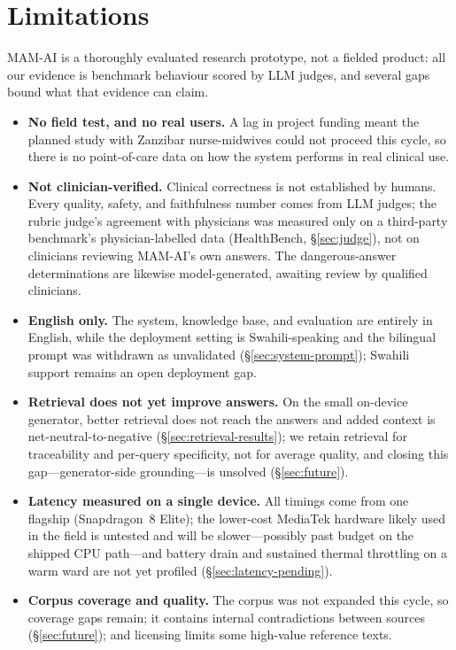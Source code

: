 \section{Limitations}
\label{sec:limitations}

MAM-AI is a thoroughly evaluated research prototype, not a fielded product: all
our evidence is benchmark behaviour scored by LLM judges, and several gaps bound
what that evidence can claim.

\begin{itemize}\setlength{\itemsep}{3pt}
  \item \textbf{No field test, and no real users.} A lag in project funding
  meant the planned study with Zanzibar nurse-midwives could not proceed this
  cycle, so there is no point-of-care data on how the system performs in real
  clinical use.

  \item \textbf{Not clinician-verified.} Clinical correctness is not
  established by humans. Every quality, safety, and faithfulness number comes
  from LLM judges; the rubric judge's agreement with physicians was measured
  only on a third-party benchmark's physician-labelled data (HealthBench,
  \S\ref{sec:judge}), not on clinicians reviewing MAM-AI's own answers. The
  dangerous-answer determinations are likewise model-generated, awaiting review
  by qualified clinicians.

  \item \textbf{English only.} The system, knowledge base, and evaluation are
  entirely in English, while the deployment setting is Swahili-speaking and the
  bilingual prompt was withdrawn as unvalidated (\S\ref{sec:system-prompt});
  Swahili support remains an open deployment gap.

  \item \textbf{Retrieval does not yet improve answers.} On the small on-device
  generator, better retrieval does not reach the answers and added context is
  net-neutral-to-negative (\S\ref{sec:retrieval-results}); we retain retrieval
  for traceability and per-query specificity, not for average quality, and
  closing this gap---generator-side grounding---is unsolved
  (\S\ref{sec:future}).

  \item \textbf{Latency measured on a single device.} All timings come from one
  flagship (Snapdragon~8 Elite); the lower-cost MediaTek hardware likely used in
  the field is untested and will be slower---possibly past budget on the shipped
  CPU path---and battery drain and sustained thermal throttling on a warm ward
  are not yet profiled (\S\ref{sec:latency-pending}).

  \item \textbf{Corpus coverage and quality.} The corpus was not expanded this
  cycle, so coverage gaps remain; it contains internal contradictions between
  sources (\S\ref{sec:future}); and licensing limits some high-value
  reference texts.
\end{itemize}
